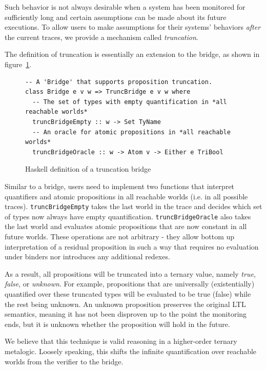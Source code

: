 \documentclass[format=acmsmall, nonacm=true, review=true, screen=true]{acmart}
\newcommand{\mycaption}[1]{\Description{#1}\caption{#1}}
\begin{document}
Such behavior is not always desirable when a system has been monitored for sufficiently long and certain assumptions can be made about its future executions.
To allow users to make assumptions for their systems' behaviors \textit{after} the current traces, we provide a mechanism called \textit{truncation}.

The definition of truncation is essentially an extension to the bridge, as shown in figure~\ref{fig:truncation-sig}.

\begin{figure}[h]
  {
    \fontsize{10}{12}\selectfont
    \begin{verbatim}
-- A 'Bridge' that supports proposition truncation.
class Bridge e v w => TruncBridge e v w where
  -- The set of types with empty quantification in *all reachable worlds*
  truncBridgeEmpty :: w -> Set TyName
  -- An oracle for atomic propositions in *all reachable worlds*
  truncBridgeOracle :: w -> Atom v -> Either e TriBool
\end{verbatim}
  }
  \mycaption{Haskell definition of a truncation bridge}
  \label{fig:truncation-sig}
\end{figure}

Similar to a bridge, users need to implement two functions that interpret quantifiers and atomic propositions in all reachable worlds (i.e. in all possible traces).
\texttt{truncBridgeEmpty} takes the last world in the trace and decides which set of types now always have empty quantification.
\texttt{truncBridgeOracle} also takes the last world and evaluates atomic propositions that are now constant in all future worlds.
These operations are not arbitrary - they allow bottom up interpretation of a residual proposition in such a way that requires no evaluation under binders nor introduces any additional redexes.

As a result, all propositions will be truncated into a ternary value, namely \textit{true}, \textit{false}, or \textit{unknown}.
For example, propositions that are universally (existentially) quantified over these truncated types will be evaluated to be true (false) while the rest being unknown.
An unknown proposition preserves the original LTL semantics, meaning it has not been disproven up to the point the monitoring ends, but it is unknown whether the proposition will hold in the future.

We believe that this technique is valid reasoning in a higher-order ternary metalogic. Loosely speaking, this shifts the infinite quantification over reachable worlds from the verifier to the bridge.
\end{document}
